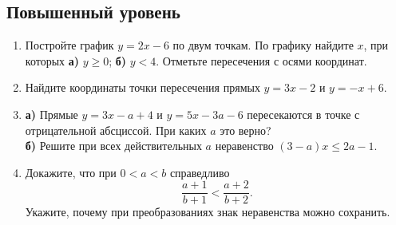 \documentclass[a4paper,12pt]{article}
\begin{document}
\subsection*{\color{accent}Повышенный уровень}
\begin{enumerate}[start=17]
\item Постройте график $y=2x-6$ по двум точкам. По графику найдите $x$, при которых \textbf{а)} $y\ge0$; \textbf{б)} $y<4$. Отметьте пересечения с осями координат.
\item Найдите координаты точки пересечения прямых $y=3x-2$ и $y=-x+6$.
\item \textbf{а)} Прямые $y=3x-a+4$ и $y=5x-3a-6$ пересекаются в точке с отрицательной абсциссой. При каких $a$ это верно?\\
\textbf{б)} Решите при всех действительных $a$ неравенство $(3-a)x\le2a-1$.
\item Докажите, что при $0<a<b$ справедливо
\[
\frac{a+1}{b+1}<\frac{a+2}{b+2}.
\]
Укажите, почему при преобразованиях знак неравенства можно сохранить.
\end{enumerate}
\clearpage
\end{document}
